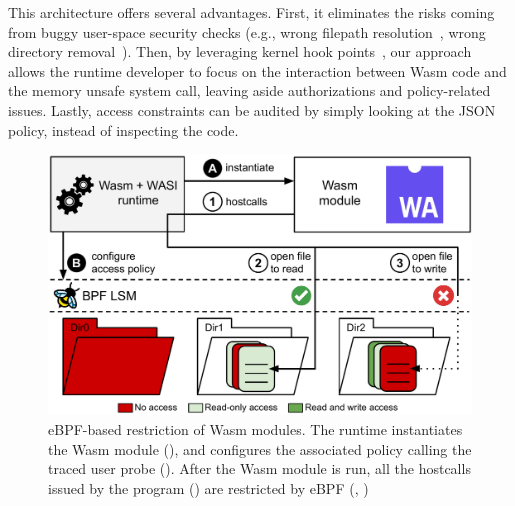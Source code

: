 This architecture offers several advantages. First, it eliminates the
risks coming from buggy user-space security checks (e.g., wrong
filepath resolution~\cite{parentfix}, wrong directory
removal~\cite{removedirfix}). Then, by leveraging kernel hook
points~\cite{bpf-lsm-hooks}, our approach allows the runtime developer
to focus on the interaction between Wasm code and the memory unsafe
system call, leaving aside authorizations and policy-related issues.
Lastly, access constraints can be audited by simply looking at the
JSON policy, instead of inspecting the code.

\begin{figure}[t!]
     \includegraphics[width=\columnwidth]{chapters/wasm/fig/wasi-bpf}
     \caption[eBPF-based restriction of Wasm modules]{
          eBPF-based restriction of Wasm modules. The runtime
          instantiates the Wasm module (), and
          configures the associated policy calling the traced user
          probe (). After the Wasm module is run, all
          the hostcalls issued by the program () are
          restricted by eBPF (, )
     }
     \label{fig:arch}
\end{figure}


